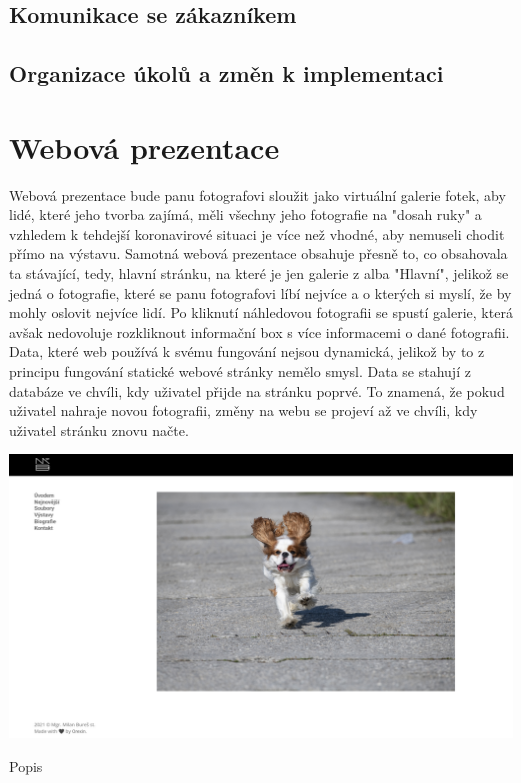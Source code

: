 \documentclass[12pt,a4paper]{report}
\begin{document}
  \section{Komunikace se zákazníkem}

  \section{Organizace úkolů a změn k implementaci}

  \chapter{Webová prezentace}
  Webová prezentace bude panu fotografovi sloužit jako virtuální galerie fotek, aby lidé, které jeho
  tvorba zajímá, měli všechny jeho fotografie na "dosah ruky" a vzhledem k tehdejší koronavirové
  situaci je více než vhodné, aby nemuseli chodit přímo na výstavu.
  Samotná webová prezentace obsahuje přesně to, co obsahovala ta stávající, tedy, hlavní stránku,
  na které je jen galerie z alba "Hlavní", jelikož se jedná o fotografie, které se panu fotografovi líbí
  nejvíce a o kterých si myslí, že by mohly oslovit nejvíce lidí. Po kliknutí náhledovou fotografii se
  spustí galerie, která avšak nedovoluje rozkliknout informační box s více informacemi o dané
  fotografii.
  Data, které web používá k svému fungování nejsou dynamická, jelikož by to z principu fungování
  statické webové stránky nemělo smysl. Data se stahují z databáze ve chvíli, kdy uživatel přijde na
  stránku poprvé. To znamená, že pokud uživatel nahraje novou fotografii, změny na webu se
  projeví až ve chvíli, kdy uživatel stránku znovu načte.

  \vspace*{0.5cm}
  \noindent\includegraphics[width=\linewidth]{dmp-bures.png}
  \begin{center}
    Popis
  \end{center}
  \vspace*{0.5cm}
\end{document}
